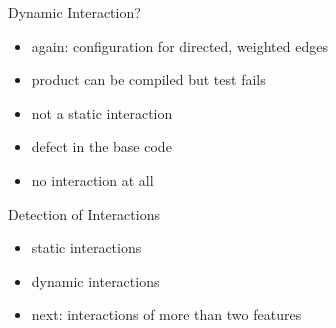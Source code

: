 \begin{frame}{\myframetitle}\setlength\leftmargini{3mm}
	\begin{fancycolumns}[widths={70}]
	\nextcolumn
		\begin{example}{Dynamic Interaction?}
			\begin{itemize}
				\item again: configuration for directed, weighted edges
				\item product can be compiled but test fails
				\item not a static interaction
				\item defect in the base code
				\item no interaction at all
			\end{itemize}
		\end{example}
		\begin{note}{Detection of Interactions}
			\begin{itemize}
				\item static interactions\\\mysource{\lectureanalyses}
				\item dynamic interactions\\\mysource{\lecturetesting}
				\item next: interactions of more than two features
			\end{itemize}
		\end{note}
	\end{fancycolumns}
\end{frame}


